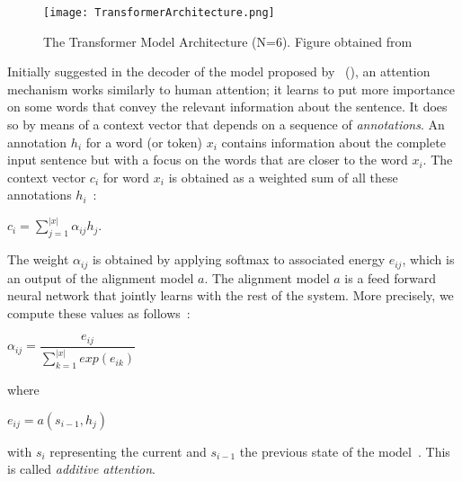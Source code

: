 \begin{figure}
    \centering
    \texttt{[image: TransformerArchitecture.png]}
    \caption[The Transformer Model Architecture]{The Transformer Model Architecture (N=6). Figure obtained from~\parencite{AttentionIsAllYouNeed_Vaswani}}
    \label{fig:transformerArchitecture}
\end{figure}
Initially suggested in the decoder of the model proposed by~\citeauthor{NeuralMachineTranslationByJointlyLearning_Bahdanau} (\citeyear{NeuralMachineTranslationByJointlyLearning_Bahdanau}), an attention mechanism works similarly to human attention; it learns to put more importance on some words that convey the relevant information about the sentence. It does so by means of a context vector that depends on a sequence of \emph{annotations}. An annotation $h_i$ for a word (or token) $x_i$ contains information about the complete input sentence but with a focus on the words that are closer to the word $x_i$. The context vector $c_i$ for word $x_i$ is obtained as a weighted sum of all these annotations $h_i$~\parencite{NeuralMachineTranslationByJointlyLearning_Bahdanau}:
\begin{center}
    $c_i = \sum\limits_{j=1}^{|x|} \alpha_{ij} h_j$.
\end{center}
The weight $\alpha_{ij}$ is obtained by applying softmax to associated energy $e_{ij}$, which is an output of the alignment model $a$. The alignment model $a$ is a feed forward neural network that jointly learns with the rest of the system. More precisely, we compute these values as follows~\parencite{NeuralMachineTranslationByJointlyLearning_Bahdanau}:
\begin{center}
    $\alpha_{ij} = \dfrac{e_{ij}}{\sum\limits_{k=1}^{|x|} exp(e_{ik})}$
\end{center}
where
\begin{center}
    $e_{ij} = a(s_{i-1}, h_j)$
\end{center}
with $s_i$ representing the current and $s_{i-1}$ the previous state of the
model~\parencite{NeuralMachineTranslationByJointlyLearning_Bahdanau}. This is called \emph{additive attention}.\\
